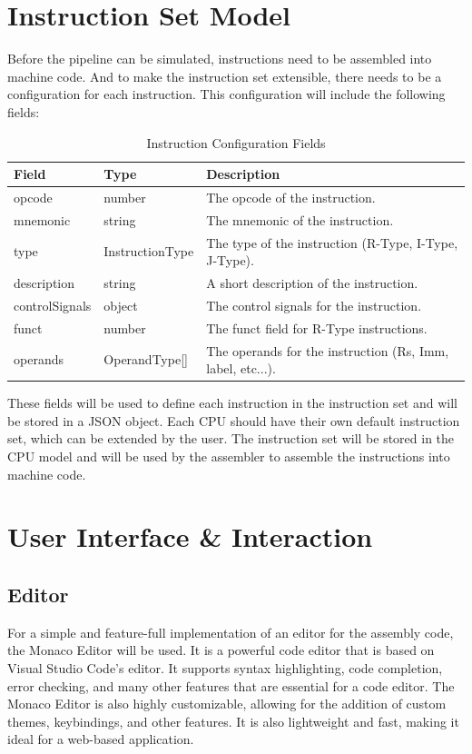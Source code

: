 \section{Instruction Set Model}
Before the pipeline can be simulated, instructions need to be assembled into machine code. And to make the instruction set extensible, there needs to be a configuration for each instruction. This configuration will include the following fields:
\begin{table}[H]
    \centering
    \begin{tabular}{|l|l|l|}
        \hline
        \textbf{Field} & \textbf{Type} & \textbf{Description} \\ \hline
        opcode & number & The opcode of the instruction. \\ \hline
        mnemonic & string & The mnemonic of the instruction. \\ \hline
        type & InstructionType & The type of the instruction (R-Type, I-Type, J-Type). \\ \hline
        description & string & A short description of the instruction. \\ \hline
        controlSignals & object & The control signals for the instruction. \\ \hline
        funct & number & The funct field for R-Type instructions. \\ \hline
        operands & OperandType[] & The operands for the instruction (Rs, Imm, label, etc...). \\ \hline
    \end{tabular}
    \caption{Instruction Configuration Fields}
    \label{tab:instruction_config}
\end{table}

These fields will be used to define each instruction in the instruction set and will be stored in a JSON object. Each CPU should have their own default instruction set, which can be extended by the user. The instruction set will be stored in the CPU model and will be used by the assembler to assemble the instructions into machine code.

\section{User Interface \& Interaction}
\subsection{Editor}
For a simple and feature-full implementation of an editor for the assembly code, the Monaco Editor will be used. It is a powerful code editor that is based on Visual Studio Code's editor. It supports syntax highlighting, code completion, error checking, and many other features that are essential for a code editor. The Monaco Editor is also highly customizable, allowing for the addition of custom themes, keybindings, and other features. It is also lightweight and fast, making it ideal for a web-based application.

